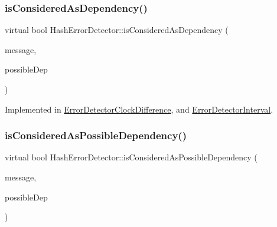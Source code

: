 \mbox{\label{class_hash_error_detector_a4693d4d5e327b19f75088cef52bcad7d}} 
\subsubsection{\texorpdfstring{is\+Considered\+As\+Dependency()}{isConsideredAsDependency()}}
{\footnotesize\ttfamily virtual bool Hash\+Error\+Detector\+::is\+Considered\+As\+Dependency (\begin{DoxyParamCaption}\item[{const \hyperlink{structures_8h_a7e7bdc1d2fff8a9436f2f352b2711ed6}{message\+Info} \&}]{message,  }\item[{const \hyperlink{structures_8h_a7e7bdc1d2fff8a9436f2f352b2711ed6}{message\+Info} \&}]{possible\+Dep }\end{DoxyParamCaption})\hspace{0.3cm}{\ttfamily [pure virtual]}}



Implemented in \hyperlink{class_error_detector_clock_difference_a4d399849b1872d3273fa757ee9dc9bd9}{Error\+Detector\+Clock\+Difference}, and \hyperlink{class_error_detector_interval_a27cb3ca9d7e5c3ddda9ee5ee66f182ed}{Error\+Detector\+Interval}.

\mbox{\label{class_hash_error_detector_ac0a25b9c1e27f98223869d11ca46d18f}} 
\subsubsection{\texorpdfstring{is\+Considered\+As\+Possible\+Dependency()}{isConsideredAsPossibleDependency()}}
{\footnotesize\ttfamily virtual bool Hash\+Error\+Detector\+::is\+Considered\+As\+Possible\+Dependency (\begin{DoxyParamCaption}\item[{const \hyperlink{structures_8h_a7e7bdc1d2fff8a9436f2f352b2711ed6}{message\+Info} \&}]{message,  }\item[{const \hyperlink{structures_8h_a7e7bdc1d2fff8a9436f2f352b2711ed6}{message\+Info} \&}]{possible\+Dep }\end{DoxyParamCaption})\hspace{0.3cm}{\ttfamily [pure virtual]}}



